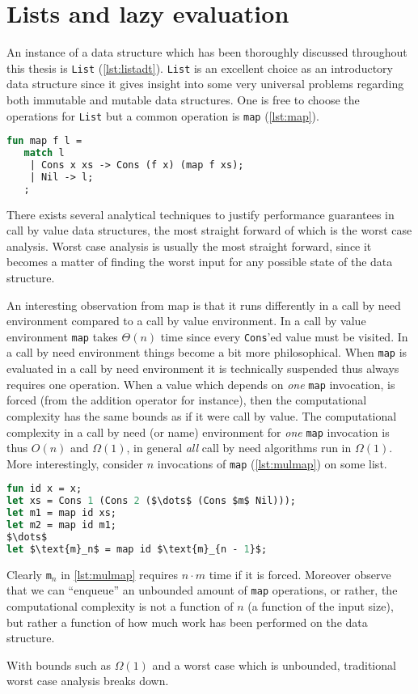 
\section{Lists and lazy evaluation}
An instance of a data structure which has been thoroughly discussed throughout this thesis is \texttt{List} (\autoref{lst:listadt}).
\texttt{List} is an excellent choice as an introductory data structure since it gives insight into some very universal problems regarding both immutable and mutable data structures.
One is free to choose the operations for \texttt{List} but a common operation is \texttt{map} (\autoref{lst:map}).
\begin{lstlisting}[language=ML,caption={Mapping from \texttt{List a} to \texttt{List b}},label={lst:map},mathescape=true]
fun map f l = 
   match l
    | Cons x xs -> Cons (f x) (map f xs);
    | Nil -> l;
   ;
\end{lstlisting}

There exists several analytical techniques to justify performance guarantees in call by value data structures, the most straight forward of which is the worst case analysis.
Worst case analysis is usually the most straight forward, since it becomes a matter of finding the worst input for any possible state of the data structure.

An interesting observation from map is that it runs differently in a call by need environment compared to a call by value environment.
In a call by value environment \texttt{map} takes $\Theta(n)$ time since every \texttt{Cons}'ed value must be visited.
In a call by need environment things become a bit more philosophical.
When \texttt{map} is evaluated in a call by need environment it is technically suspended thus always requires one operation.
When a value which depends on \textit{one} \texttt{map} invocation, is forced (from the addition operator for instance), then the computational complexity has the same bounds as if it were call by value.
The computational complexity in a call by need (or name) environment for \textit{one} \texttt{map} invocation is thus $O(n)$ and $\Omega(1)$, in general \textit{all} call by need algorithms run in $\Omega(1)$.
More interestingly, consider $n$ invocations of \texttt{map} (\autoref{lst:mulmap}) on some list.
\begin{lstlisting}[language=ML,caption={$n$ invocation of map},label={lst:mulmap},mathescape=true]
fun id x = x;
let xs = Cons 1 (Cons 2 ($\dots$ (Cons $m$ Nil)));
let m1 = map id xs;
let m2 = map id m1;
$\dots$
let $\text{m}_n$ = map id $\text{m}_{n - 1}$;
\end{lstlisting}
Clearly \texttt{m$_n$} in \autoref{lst:mulmap} requires $n \cdot m$ time if it is forced.
Moreover observe that we can ``enqueue'' an unbounded amount of \texttt{map} operations, or rather, the computational complexity is not a function of $n$ (a function of the input size), but rather a function of how much work has been performed on the data structure.

With bounds such as $\Omega(1)$ and a worst case which is unbounded, traditional worst case analysis breaks down.
